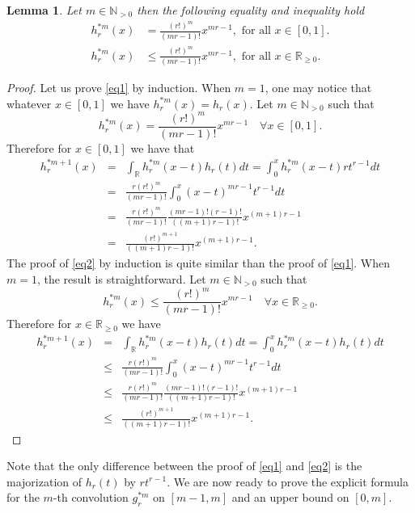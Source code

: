 \documentclass{article}
\theoremstyle{plain}
\newtheorem{lemma}[theorem]{Lemma}
\newcommand{\N}{{\mathbb N}}
\newcommand{\R}{{\mathbb R}}
\begin{document}
\begin{lemma}\label{lem:h}
Let $m\in \N_{>0}$ then the following equality and inequality hold
\begin{eqnarray}\label{eq1}
h_r^{*m}(x) &=\frac{(r!)^m}{(mr-1)!}x^{mr-1}, \text{ for all }x\in [0,1].\\ \label{eq2}
h_r^{*m}(x) &\le \frac{(r!)^m}{(mr-1)!}x^{mr-1}, \text{ for all }x\in \R_{\ge 0}.
\end{eqnarray}
\end{lemma}
\begin{proof}  

Let us prove \eqref{eq1} by induction.
 When $m=1$, one may notice that whatever $x\in [0,1]$ we have $h_r^{*m}(x)=h_r(x)$.
Let $m\in \N_{>0}$ such that
\[h_r^{*m}(x)=\frac{(r!)^m}{(mr-1)!}x^{mr-1} \quad \forall x\in [0,1].\]
Therefore for $x\in [0,1]$ we have that
\begin{eqnarray*}
h_r^{*m+1}(x)&=&\int_{\R}h^{*m}_r(x-t)h_r(t)dt=\int_{0}^{x}h^{*m}_r(x-t)rt^{r-1}dt\\
&=&\frac{r(r!)^m}{(mr-1)!}\int_{0}^{x}(x-t)^{mr-1}t^{r-1}dt\\
&=& \frac{r(r!)^m}{(mr-1)!}\frac{(mr-1)!(r-1)!}{((m+1)r-1)!}x^{(m+1)r-1}\\
&=&\frac{(r!)^{m+1}}{((m+1)r-1)!}x^{(m+1)r-1}.
\end{eqnarray*}
The proof of \eqref{eq2} by induction is quite similar than the proof of \eqref{eq1}. When $m=1$, the result is straightforward. 
Let $m\in \N_{>0}$ such that
\[h_r^{*m}(x)\le \frac{(r!)^m}{(mr-1)!}x^{mr-1} \quad \forall x\in  \R_{\ge 0}.\]
Therefore for $x\in \R_{\ge 0}$ we have 
\begin{eqnarray*}
h_r^{*m+1}(x)&=&\int_{\R}h^{*m}_r(x-t)h_r(t)dt=\int_{0}^{x}h^{*m}_r(x-t)h_r(t)dt\\
&\le &\frac{r(r!)^m}{(mr-1)!}\int_{0}^{x}(x-t)^{mr-1}t^{r-1}dt\\
&\le & \frac{r(r!)^m}{(mr-1)!}\frac{(mr-1)!(r-1)!}{((m+1)r-1)!}x^{(m+1)r-1}\\
&\le &\frac{(r!)^{m+1}}{((m+1)r-1)!}x^{(m+1)r-1}. 
\end{eqnarray*} 
\end{proof}

Note that the only difference between the proof of \eqref{eq1} and \eqref{eq2} is the majorization of $h_r(t)$ by $rt^{r-1}$. 
We are now ready to prove the explicit formula for the $m$-th convolution $g_r^{*m}$ on $[m-1,m]$ and an upper bound on $[0,m]$.
\end{document}
